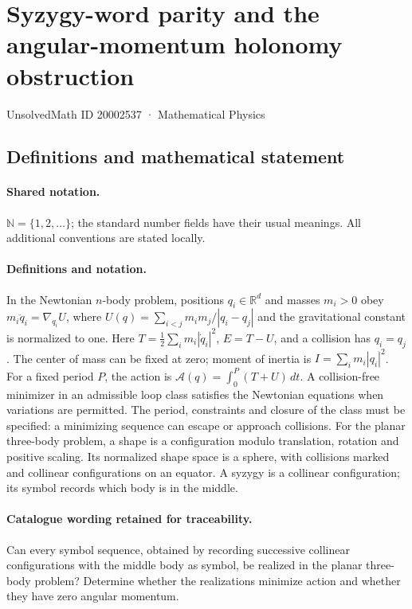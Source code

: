 \documentclass[11pt]{article}
\begin{document}
\setcounter{section}{20002536}
\section{Syzygy-word parity and the angular-momentum holonomy obstruction}\label{20002537}
{\small UnsolvedMath ID 20002537 · Mathematical Physics}
\subsection{Definitions and mathematical statement}

\paragraph{Shared notation.}$\mathbb N=\{1,2,\ldots\}$; the standard number fields have their usual meanings. All additional conventions are stated locally.


\paragraph{Definitions and notation.}In the Newtonian $n$-body problem, positions $q_i\in\mathbb R^d$ and masses $m_i>0$ obey $m_i\ddot q_i=\nabla_{q_i}U$, where $U(q)=\sum_{i<j}m_im_j/|q_i-q_j|$ and the gravitational constant is normalized to one. Here $T=\tfrac12\sum_i m_i|\dot q_i|^2$, $E=T-U$, and a collision has $q_i=q_j$. The center of mass can be fixed at zero; moment of inertia is $I=\sum_i m_i|q_i|^2$. For a fixed period $P$, the action is $\mathcal A(q)=\int_0^P(T+U)\,dt$. A collision-free minimizer in an admissible loop class satisfies the Newtonian equations when variations are permitted. The period, constraints and closure of the class must be specified: a minimizing sequence can escape or approach collisions. For the planar three-body problem, a shape is a configuration modulo translation, rotation and positive scaling. Its normalized shape space is a sphere, with collisions marked and collinear configurations on an equator. A syzygy is a collinear configuration; its symbol records which body is in the middle. 

\paragraph{Catalogue wording retained for traceability.}
Can every symbol sequence, obtained by recording successive collinear configurations with the middle body as symbol, be realized in the planar three-body problem? Determine whether the realizations minimize action and whether they have zero angular momentum.
\end{document}
